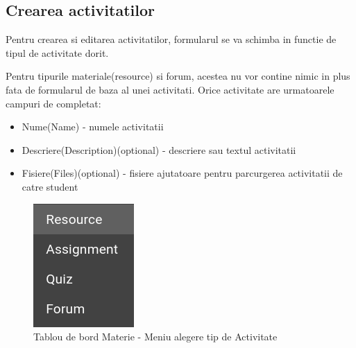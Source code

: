 \documentclass[12pt, a4paper, oneside, romanian]{teza-upb}
\begin{document}
\subsection{Crearea activitatilor}

Pentru crearea si editarea activitatilor, formularul se va schimba in functie de tipul de activitate dorit.

Pentru tipurile materiale(resource) si forum, acestea nu vor contine nimic in plus fata de formularul de baza al unei activitati. Orice activitate are urmatoarele campuri de completat:
\begin{itemize}
	\item Nume(Name) - numele activitatii
	\item Descriere(Description)(optional) - descriere sau textul activitatii
	\item Fisiere(Files)(optional) - fisiere ajutatoare pentru parcurgerea activitatii de catre student
\end{itemize}

\begin{figure}[H]
\centering
\includegraphics*[width=0.2\columnwidth]{tablou-de-bord-materie-meniu-alegere-tip-de-activitate}
\caption{Tablou de bord Materie - Meniu alegere tip de Activitate}
\label{tablou-de-bord-materie-meniu-alegere-tip-de-activitate}
\end{figure}
\end{document}
